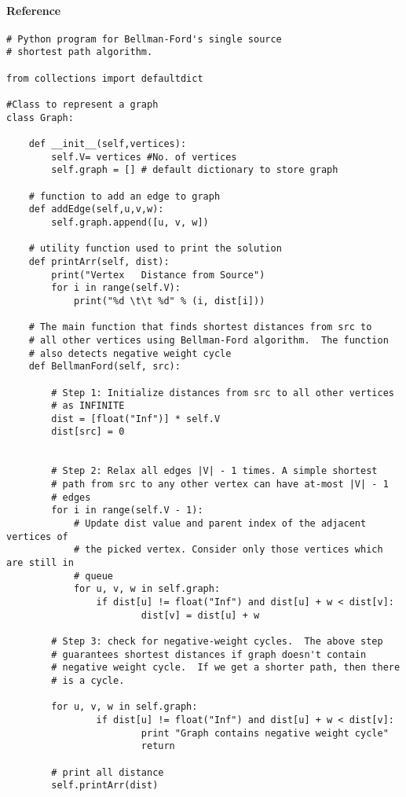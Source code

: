 \paragraph{Reference} \cite{Algorithm4}
\begin{lstlisting}
# Python program for Bellman-Ford's single source 
# shortest path algorithm.
 
from collections import defaultdict
 
#Class to represent a graph
class Graph:
 
    def __init__(self,vertices):
        self.V= vertices #No. of vertices
        self.graph = [] # default dictionary to store graph
  
    # function to add an edge to graph
    def addEdge(self,u,v,w):
        self.graph.append([u, v, w])
         
    # utility function used to print the solution
    def printArr(self, dist):
        print("Vertex   Distance from Source")
        for i in range(self.V):
            print("%d \t\t %d" % (i, dist[i]))
     
    # The main function that finds shortest distances from src to
    # all other vertices using Bellman-Ford algorithm.  The function
    # also detects negative weight cycle
    def BellmanFord(self, src):
 
        # Step 1: Initialize distances from src to all other vertices
        # as INFINITE
        dist = [float("Inf")] * self.V
        dist[src] = 0
 
 
        # Step 2: Relax all edges |V| - 1 times. A simple shortest 
        # path from src to any other vertex can have at-most |V| - 1 
        # edges
        for i in range(self.V - 1):
            # Update dist value and parent index of the adjacent vertices of
            # the picked vertex. Consider only those vertices which are still in
            # queue
            for u, v, w in self.graph:
                if dist[u] != float("Inf") and dist[u] + w < dist[v]:
                        dist[v] = dist[u] + w
 
        # Step 3: check for negative-weight cycles.  The above step 
        # guarantees shortest distances if graph doesn't contain 
        # negative weight cycle.  If we get a shorter path, then there
        # is a cycle.
 
        for u, v, w in self.graph:
                if dist[u] != float("Inf") and dist[u] + w < dist[v]:
                        print "Graph contains negative weight cycle"
                        return
                         
        # print all distance
        self.printArr(dist)
\end{lstlisting}

